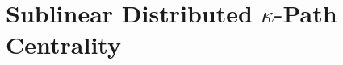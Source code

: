 \documentclass{report}
\newcommand{\algoname}[1]{\textnormal{\textsc{#1}}}
\begin{document}
\section{Sublinear Distributed $\kappa$-Path Centrality}
 \label{kpath:sec:alg}




%
%
\end{document}

